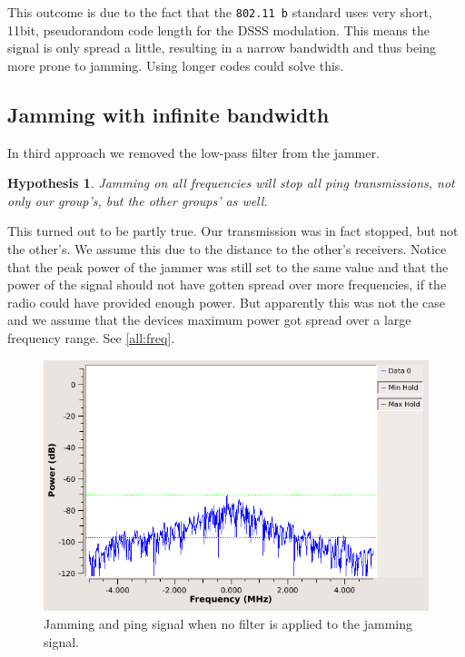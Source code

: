 \documentclass[12pt,a4paper]{article}
\newtheorem{hypo}{Hypothesis}
\begin{document}
	This outcome is due to the fact that the \texttt{802.11 b} standard uses very short, 11bit, pseudorandom code length for the DSSS modulation. This means the signal is only spread a little, resulting in a narrow bandwidth and thus being more prone to jamming.
	Using longer codes could solve this. 

\subsection{Jamming with infinite bandwidth}
	In third approach we removed the low-pass filter from the jammer.
	\begin{hypo}
		Jamming on all frequencies will stop all ping transmissions, not only our group's, but the other groups' as well.
	\end{hypo}
	
	This turned out to be partly true.
	Our transmission was in fact stopped, but not the other's.
	We assume this due to the distance to the other's receivers.
	Notice that the peak power of the jammer was still set to the same value and that the power of the signal should not have gotten spread over more frequencies, if the radio could have provided enough power. 
	But apparently this was not the case and we assume that the devices maximum power got spread over a large frequency range.
	See \autoref{all:freq}.
	
	\begin{figure}
		\includegraphics[width=\textwidth]{images/mon_jamallfrequ_ping.png}
		\caption{Jamming and ping signal when no filter is applied to the jamming signal.}
		\label{all:freq}
	\end{figure}
	
\end{document}
